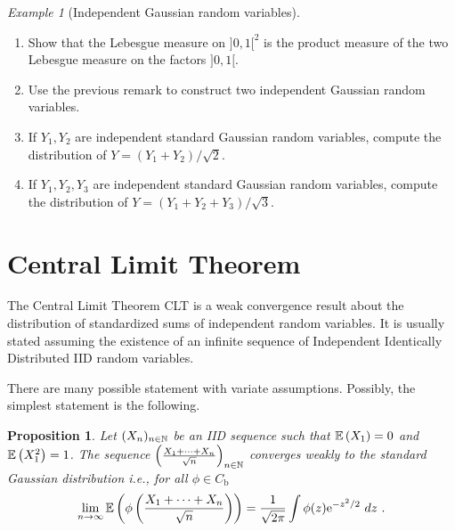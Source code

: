 \documentclass[12pt,a4paper]{amsart}
\theoremstyle{plain}%
\newtheorem{proposition}[thm]{Proposition}
\theoremstyle{definition}
\theoremstyle{remark}
\newtheorem{example}{Example}
\begin{document}
\begin{example}[Independent Gaussian random variables]
  \begin{enumerate}
  \item Show that the Lebesgue measure on $]0,1[^2$ is the product
    measure of the two Lebesgue measure on the factors $]0,1[$.
  \item Use the previous remark to construct two independent Gaussian random variables.
  \item If $Y_1,Y_2$ are independent standard Gaussian random variables, compute the distribution of $Y = (Y_1 + Y_2)/\sqrt 2$.
  \item If $Y_1,Y_2,Y_3$ are independent standard Gaussian random
    variables, compute the distribution of $Y = (Y_1+Y_2+Y_3)/\sqrt 3$.
  \end{enumerate}
\end{example}

\section{Central Limit Theorem}
\label{sec:centr-limit-theor}

The Central Limit Theorem CLT is a weak convergence result about the distribution of standardized sums of independent random variables. It is usually stated assuming the existence of an infinite sequence of Independent Identically Distributed IID random variables.

There are many possible statement with variate assumptions. Possibly,
the simplest statement is the following.
\begin{proposition}Let $(X_n)_{n \in \mathbb{N}}$ be an IID sequence such that $\operatorname{\mathbb E}\left(X_1\right) = 0$ and $\operatorname{\mathbb E}\left(X_1^2\right) = 1$. The sequence $\left(\frac{X_1+\cdots+X_n}{\sqrt n}\right)_{n\in\mathbb{N}}$ converges weakly to the standard Gaussian distribution i.e., for all $\phi \in C_{\text{b}}$
  \begin{equation*}
    \lim_{n \to \infty} \operatorname{\mathbb E}\left(\phi\left(\frac{X_1+\cdots+X_n}{\sqrt n}\right)\right) = \frac1{\sqrt{2\pi}} \int \phi(z) \mathrm{e}^{- z^2/2} \ dz \ .
  \end{equation*}
\end{proposition}
\end{document}

